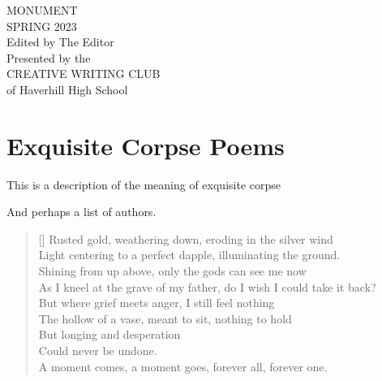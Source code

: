 \begin{titlingpage}
    \centering
    \vfill
    {\HUGE MONUMENT}\\[\baselineskip]
    {\Large SPRING 2023}\\[\baselineskip]
    {Edited by The Editor}\\[0.15\textheight]
    {Presented by the}\\[\baselineskip]
    {\Large CREATIVE WRITING CLUB}\\[\baselineskip]
    {of Haverhill High School}\\[\baselineskip]
    \vfill\null
\end{titlingpage}
\frontmatter

\clearpage
\tableofcontents
\clearpage

\mainmatter
\pagestyle{headings}

\chapter{Exquisite Corpse Poems}

This is a description of the meaning of exquisite corpse

And perhaps a list of authors.


\clearpage
{}
\settowidth{\versewidth}{As I kneel at the grave of my father, do I wish I could take it back?}
\begin{verse}[\versewidth]
Rusted gold, weathering down, eroding in the silver wind\\
Light centering to a perfect dapple, illuminating the ground.\\
Shining from up above, only the gods can see me now\\
As I kneel at the grave of my father, do I wish I could take it back?\\
But where grief meets anger, I still feel nothing\\
The hollow of a vase, meant to sit, nothing to hold\\
But longing and desperation\\
Could never be undone.\\
A moment comes, a moment goes, forever all, forever one.\\
\end{verse}

